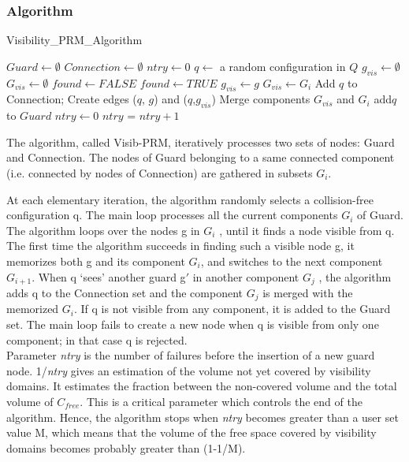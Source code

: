 \documentclass[11pt]{article}
\begin{document}
\subsubsection{Algorithm}

\begin{algorithm} 
\caption{Visibility\_PRM\_Algorithm} 
\label{alg:prm_alg} 
  \begin{algorithmic}[1]

    \STATE $Guard \leftarrow \emptyset$ 
    \STATE $Connection \leftarrow \emptyset$
    \STATE $ntry \leftarrow 0$
    \STATE $q \leftarrow$ a random configuration in $Q$     
    \STATE $g_{vis} \leftarrow \emptyset$
    \STATE $G_{vis} \leftarrow \emptyset$
        \REPEAT
        \STATE $found \leftarrow FALSE$
                \STATE $found \leftarrow TRUE$
              \ENDIF
                  \STATE $g_{vis} \leftarrow g$
                  \STATE $G_{vis} \leftarrow G_{i}$
              \ENDIF
              \ELSE
                  \STATE Add $q$ to Connection;
                  \STATE Create edges ($q$, $g$) and ($q$,$g_{vis}$)
                  \STATE Merge components $G_{vis}$ and $G_{i}$
          \ENDFOR
              \STATE add{$q$} to $Guard$
              \STATE $ntry \leftarrow 0$
          \ENDIF
          \ELSE
              \STATE $ntry$ = $ntry+1$
      \ENDFOR
  \ENDWHILE
    \end{algorithmic}
\end{algorithm}


The algorithm, called Visib-PRM, iteratively processes two sets of nodes: Guard
and Connection. The nodes of Guard belonging to a same connected component
(i.e. connected by nodes of Connection) are gathered in subsets $G_i$.


At each elementary iteration, the algorithm randomly selects a collision-free
configuration q. The main loop processes all the current components $G_i$ of Guard. The algorithm loops over the nodes g in $G_i$ , until it finds a node visible from q. The
first time the algorithm succeeds in finding such a visible node g, it memorizes both
g and its component $G_i$, and switches to the next component $G_{i+1}$. When q ‘sees’
another guard g$'$ in another component $G_j$ , the algorithm adds q to the Connection
set and the component $G_j$ is merged with the memorized $G_i$. If q is not visible from
any component, it is added to the Guard set. The main loop fails to create a new
node when q is visible from only one component; in that case q is rejected.\\
Parameter \textit{ntry} is the number of failures before the insertion of a new guard node.
1/\textit{ntry} gives an estimation of the volume not yet covered by visibility domains.
It estimates the fraction between the non-covered volume and the total volume of
$C_{free}$. This is a critical parameter which controls the end of the algorithm. Hence,
the algorithm stops when \textit{ntry} becomes greater than a user set value M, which
means that the volume of the free space covered by visibility domains becomes
probably greater than (1-1/M).
\end{document}
